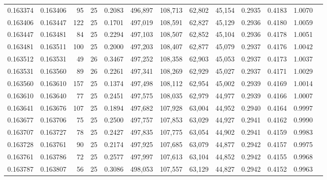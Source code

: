 \begin{tabular}{rrrrrrrrrrrrr}
0.163374 & 0.163406 &    95 &  25 &                                     0.2083 & 496,897 & 108,713 &  62,802 &  45,154 & 0.2935 & 0.4183 & 1.0070 \\
0.163406 & 0.163447 &   122 &  25 &                                     0.1701 & 497,019 & 108,591 &  62,827 &  45,129 & 0.2936 & 0.4180 & 1.0059 \\
0.163447 & 0.163481 &    84 &  25 &                                     0.2294 & 497,103 & 108,507 &  62,852 &  45,104 & 0.2936 & 0.4178 & 1.0051 \\
0.163481 & 0.163511 &   100 &  25 &                                     0.2000 & 497,203 & 108,407 &  62,877 &  45,079 & 0.2937 & 0.4176 & 1.0042 \\
0.163512 & 0.163531 &    49 &  26 &                                     0.3467 & 497,252 & 108,358 &  62,903 &  45,053 & 0.2937 & 0.4173 & 1.0037 \\
0.163531 & 0.163560 &    89 &  26 &                                     0.2261 & 497,341 & 108,269 &  62,929 &  45,027 & 0.2937 & 0.4171 & 1.0029 \\
0.163560 & 0.163610 &   157 &  25 &                                     0.1374 & 497,498 & 108,112 &  62,954 &  45,002 & 0.2939 & 0.4169 & 1.0014 \\
0.163610 & 0.163640 &    77 &  25 &                                     0.2451 & 497,575 & 108,035 &  62,979 &  44,977 & 0.2939 & 0.4166 & 1.0007 \\
0.163641 & 0.163676 &   107 &  25 &                                     0.1894 & 497,682 & 107,928 &  63,004 &  44,952 & 0.2940 & 0.4164 & 0.9997 \\
0.163677 & 0.163706 &    75 &  25 &                                     0.2500 & 497,757 & 107,853 &  63,029 &  44,927 & 0.2941 & 0.4162 & 0.9990 \\
0.163707 & 0.163727 &    78 &  25 &                                     0.2427 & 497,835 & 107,775 &  63,054 &  44,902 & 0.2941 & 0.4159 & 0.9983 \\
0.163728 & 0.163761 &    90 &  25 &                                     0.2174 & 497,925 & 107,685 &  63,079 &  44,877 & 0.2942 & 0.4157 & 0.9975 \\
0.163761 & 0.163786 &    72 &  25 &                                     0.2577 & 497,997 & 107,613 &  63,104 &  44,852 & 0.2942 & 0.4155 & 0.9968 \\
0.163787 & 0.163807 &    56 &  25 &                                     0.3086 & 498,053 & 107,557 &  63,129 &  44,827 & 0.2942 & 0.4152 & 0.9963 \\

\end{tabular}
